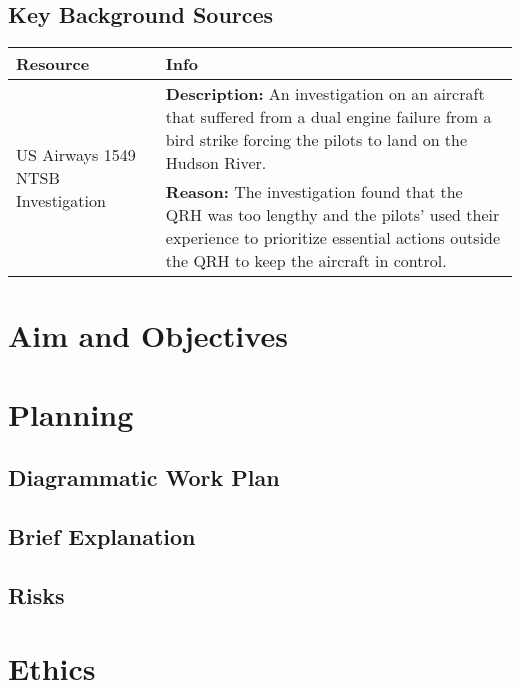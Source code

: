 \documentclass[a4paper]{article}
\begin{document}
\subsection{Key Background Sources}
\begin{tabularx}{\linewidth}{p{8em} X}
    \toprule
    Resource & Info \\
    \midrule
    \multirow{2}{*}{\parbox{8em}{US Airways 1549 NTSB Investigation~\cite{AWE1549}}}
    & \textbf{Description:} An investigation on an aircraft that
        suffered from a dual engine failure from a bird strike
        forcing the pilots to land on the Hudson River. \\
    & \textbf{Reason:} The investigation found that the QRH was too
        lengthy and the pilots' used their experience to prioritize
        essential actions outside the QRH to keep the aircraft in control. \\
    \bottomrule
\end{tabularx}

\section{Aim and Objectives}


\section{Planning}
\subsection{Diagrammatic Work Plan}

\subsection{Brief Explanation}

\subsection{Risks}


\clearpage

\section{Ethics}
\end{document}
